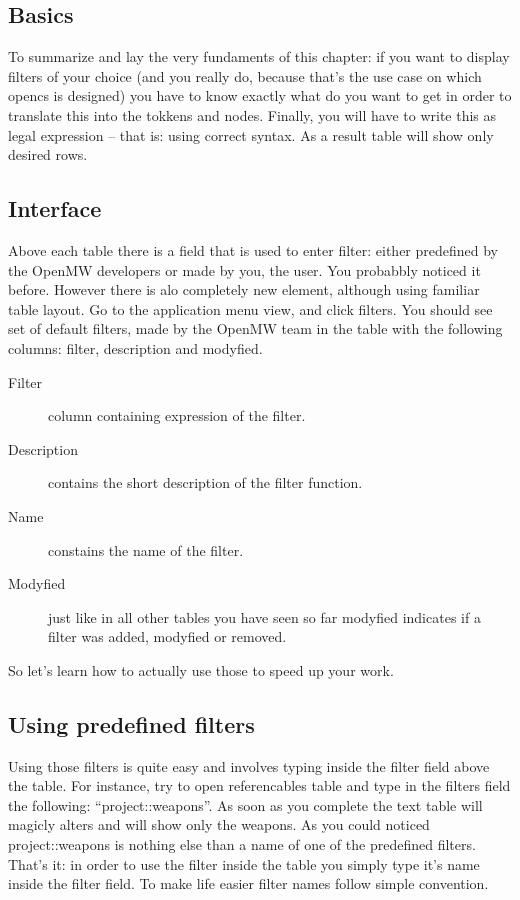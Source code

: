 \subsection{Basics}
To summarize and lay the very fundaments of this chapter: if you want to display filters of your choice (and you really do, because that's the use case on which opencs is designed) you have to know exactly what do you want to get in order to translate this into the tokkens and nodes. Finally, you will have to write this as legal expression -- that is: using correct syntax. As a result table will show only desired rows.

\subsection{Interface}
Above each table there is a field that is used to enter filter: either predefined by the OpenMW developers or made by you, the user. You probabbly noticed it before. However there is alo completely new element, although using familiar table layout. Go to the application menu view, and click filters. You should see set of default filters, made by the OpenMW team in the table with the following columns: filter, description and modyfied.

\begin{description}
 \item[Filter] column containing expression of the filter.
 \item[Description] contains the short description of the filter function.
 \item[Name] constains the name of the filter.
 \item[Modyfied] just like in all other tables you have seen so far modyfied indicates if a filter was added, modyfied or removed.
\end{description}

So let's learn how to actually use those to speed up your work.
\subsection{Using predefined filters}
Using those filters is quite easy and involves typing inside the filter field above the table. For instance, try to open referencables table and type in the filters field the following: ``project::weapons''. As soon as you complete the text table will magicly alters and will show only the weapons. As you could noticed project::weapons is nothing else than a name of one of the predefined filters. That's it: in order to use the filter inside the table you simply type it's name inside the filter field.
\linebreak
To make life easier filter names follow simple convention. 

